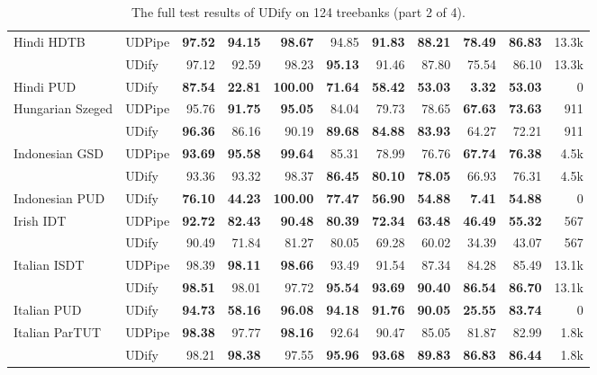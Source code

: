 \documentclass[11pt,a4paper]{article}
\begin{document}
\begin{table*}
\begin{center}
\begin{tabular}{@{}llrrrrrrrrr@{}}
    \addlinespace
    Hindi HDTB & UDPipe &  \bf 97.52 &  \bf 94.15 &   \bf 98.67 &      94.85 &  \bf 91.83 &  \bf 88.21 &  \bf 78.49 &  \bf 86.83 &  13.3k \\
               & UDify &      97.12 &      92.59 &       98.23 &  \bf 95.13 &      91.46 &      87.80 &      75.54 &      86.10 &  13.3k \\
    \addlinespace
    Hindi PUD & UDify &  \bf 87.54 &  \bf 22.81 &  \bf 100.00 &  \bf 71.64 &  \bf 58.42 &  \bf 53.03 &   \bf 3.32 &  \bf 53.03 &      0 \\
    \addlinespace
    Hungarian Szeged & UDPipe &      95.76 &  \bf 91.75 &   \bf 95.05 &      84.04 &      79.73 &      78.65 &  \bf 67.63 &  \bf 73.63 &    911 \\
               & UDify &  \bf 96.36 &      86.16 &       90.19 &  \bf 89.68 &  \bf 84.88 &  \bf 83.93 &      64.27 &      72.21 &    911 \\
    \addlinespace
    Indonesian GSD & UDPipe &  \bf 93.69 &  \bf 95.58 &   \bf 99.64 &      85.31 &      78.99 &      76.76 &  \bf 67.74 &  \bf 76.38 &   4.5k \\
               & UDify &      93.36 &      93.32 &       98.37 &  \bf 86.45 &  \bf 80.10 &  \bf 78.05 &      66.93 &      76.31 &   4.5k \\
    \addlinespace
    Indonesian PUD & UDify &  \bf 76.10 &  \bf 44.23 &  \bf 100.00 &  \bf 77.47 &  \bf 56.90 &  \bf 54.88 &   \bf 7.41 &  \bf 54.88 &      0 \\
    \addlinespace
    Irish IDT & UDPipe &  \bf 92.72 &  \bf 82.43 &   \bf 90.48 &  \bf 80.39 &  \bf 72.34 &  \bf 63.48 &  \bf 46.49 &  \bf 55.32 &    567 \\
               & UDify &      90.49 &      71.84 &       81.27 &      80.05 &      69.28 &      60.02 &      34.39 &      43.07 &    567 \\
    \addlinespace
    Italian ISDT & UDPipe &      98.39 &  \bf 98.11 &   \bf 98.66 &      93.49 &      91.54 &      87.34 &      84.28 &      85.49 &  13.1k \\
               & UDify &  \bf 98.51 &      98.01 &       97.72 &  \bf 95.54 &  \bf 93.69 &  \bf 90.40 &  \bf 86.54 &  \bf 86.70 &  13.1k \\
    \addlinespace
    Italian PUD & UDify &  \bf 94.73 &  \bf 58.16 &   \bf 96.08 &  \bf 94.18 &  \bf 91.76 &  \bf 90.05 &  \bf 25.55 &  \bf 83.74 &      0 \\
    \addlinespace
    Italian ParTUT & UDPipe &  \bf 98.38 &      97.77 &   \bf 98.16 &      92.64 &      90.47 &      85.05 &      81.87 &      82.99 &   1.8k \\
               & UDify &      98.21 &  \bf 98.38 &       97.55 &  \bf 95.96 &  \bf 93.68 &  \bf 89.83 &  \bf 86.83 &  \bf 86.44 &   1.8k \\
    \bottomrule
    \end{tabular}
    \end{center}
    \caption{\label{table:full-results-2} The full test results of UDify on 124 treebanks (part 2 of 4).}
\end{table*}
\end{document}
